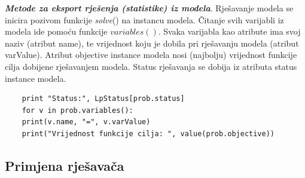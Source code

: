 \documentclass[a4paper, utf8, 11pt, colorlinks]{article}
\begin{document}
 \noindent \textbf{\emph{Metode za eksport rješenja (statistike) iz modela}}. Rješavanje modela se inicira pozivom funkcije \emph{solve}() na instancu modela. Čitanje svih varijabli iz modela ide pomoću funkcije $variables()$. Svaka varijabla kao atribute ima svoj naziv (atribut name), te vrijednost koju je dobila pri rješavanju modela (atribut varValue). Atribut objective instance modela nosi (najbolju) vrijednost funkcije cilja dobijene rješavanjem modela. Status rješavanja se dobija iz atributa status instance modela. 
 
 \begin{verbatim}
 	print "Status:", LpStatus[prob.status]
 	for v in prob.variables():
 	print(v.name, "=", v.varValue)
 	print("Vrijednost funkcije cilja: ", value(prob.objective))
 \end{verbatim}
 \subsection{Primjena rješavača}%
 
\end{document}
